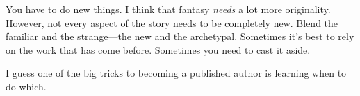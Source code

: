 You have to do new things. I think that fantasy \textit{needs} a lot more originality. However, not every aspect of the story needs to be completely new. Blend the familiar and the strange—the new and the archetypal. Sometimes it’s best to rely on the work that has come before. Sometimes you need to cast it aside.

I guess one of the big tricks to becoming a published author is learning when to do which.



